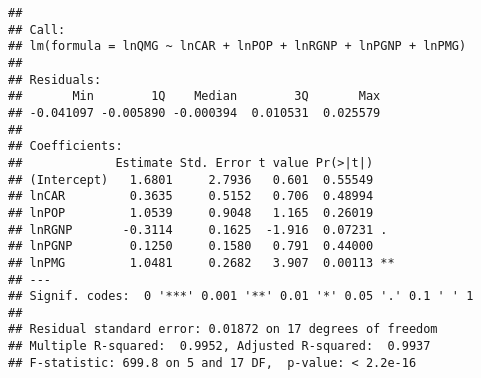 \documentclass[
]{article}
\newenvironment{Shaded}{\begin{snugshade}}{\end{snugshade}}
\newcommand{\CommentTok}[1]{\textcolor[rgb]{0.56,0.35,0.01}{\textit{#1}}}
\newcommand{\DataTypeTok}[1]{\textcolor[rgb]{0.13,0.29,0.53}{#1}}
\newcommand{\DecValTok}[1]{\textcolor[rgb]{0.00,0.00,0.81}{#1}}
\newcommand{\FloatTok}[1]{\textcolor[rgb]{0.00,0.00,0.81}{#1}}
\newcommand{\KeywordTok}[1]{\textcolor[rgb]{0.13,0.29,0.53}{\textbf{#1}}}
\newcommand{\NormalTok}[1]{#1}
\newcommand{\OperatorTok}[1]{\textcolor[rgb]{0.81,0.36,0.00}{\textbf{#1}}}
\newcommand{\StringTok}[1]{\textcolor[rgb]{0.31,0.60,0.02}{#1}}
\begin{document}
\begin{Shaded}
\end{Shaded}

\begin{verbatim}
## 
## Call:
## lm(formula = lnQMG ~ lnCAR + lnPOP + lnRGNP + lnPGNP + lnPMG)
## 
## Residuals:
##       Min        1Q    Median        3Q       Max 
## -0.041097 -0.005890 -0.000394  0.010531  0.025579 
## 
## Coefficients:
##             Estimate Std. Error t value Pr(>|t|)   
## (Intercept)   1.6801     2.7936   0.601  0.55549   
## lnCAR         0.3635     0.5152   0.706  0.48994   
## lnPOP         1.0539     0.9048   1.165  0.26019   
## lnRGNP       -0.3114     0.1625  -1.916  0.07231 . 
## lnPGNP        0.1250     0.1580   0.791  0.44000   
## lnPMG         1.0481     0.2682   3.907  0.00113 **
## ---
## Signif. codes:  0 '***' 0.001 '**' 0.01 '*' 0.05 '.' 0.1 ' ' 1
## 
## Residual standard error: 0.01872 on 17 degrees of freedom
## Multiple R-squared:  0.9952, Adjusted R-squared:  0.9937 
## F-statistic: 699.8 on 5 and 17 DF,  p-value: < 2.2e-16
\end{verbatim}
\end{document}
